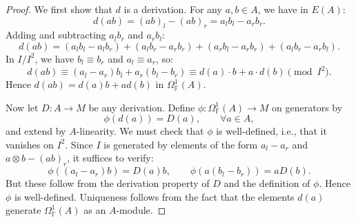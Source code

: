 \documentclass[10pt,a4paper]{amsart}
\begin{document}
\begin{proof}
We first show that $d$ is a derivation. For any $a, b \in A$, we have in $E(A)$:
\[
d(ab) = (ab)_l - (ab)_r = a_l b_l - a_r b_r.
\]
Adding and subtracting $a_l b_r$ and $a_r b_l$:
\[
d(ab) = (a_l b_l - a_l b_r) + (a_l b_r - a_r b_r) + (a_r b_l - a_r b_r) + (a_l b_r - a_r b_l).
\]
In $I/I^2$, we have $b_l \equiv b_r$ and $a_l \equiv a_r$, so:
\[
d(ab) \equiv (a_l - a_r) b_l + a_r (b_l - b_r) \equiv d(a) \cdot b + a \cdot d(b) \pmod{I^2}.
\]
Hence $d(ab) = d(a) b + a d(b)$ in $\Omega^1_{\mathbb{F}}(A)$.

Now let $D: A \to M$ be any derivation. Define $\phi: \Omega^1_{\mathbb{F}}(A) \to M$ on generators by
\[
\phi(d(a)) = D(a), \qquad \forall a \in A,
\]
and extend by $A$-linearity. We must check that $\phi$ is well-defined, i.e., that it vanishes on $I^2$. Since $I$ is generated by elements of the form $a_l - a_r$ and $a \otimes b - (ab)_r$, it suffices to verify:
\[
\phi((a_l - a_r) b) = D(a) b, \qquad \phi(a (b_l - b_r)) = a D(b).
\]
But these follow from the derivation property of $D$ and the definition of $\phi$. Hence $\phi$ is well-defined. Uniqueness follows from the fact that the elements $d(a)$ generate $\Omega^1_{\mathbb{F}}(A)$ as an $A$-module. 
\end{proof}
\end{document}
